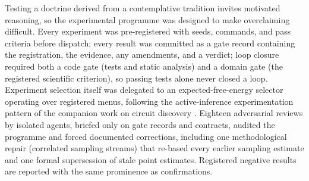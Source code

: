 Testing a doctrine derived from a contemplative tradition invites motivated reasoning, so the experimental programme was designed to make overclaiming difficult. Every experiment was pre-registered with seeds, commands, and pass criteria before dispatch; every result was committed as a gate record containing the registration, the evidence, any amendments, and a verdict; loop closure required both a code gate (tests and static analysis) and a domain gate (the registered scientific criterion), so passing tests alone never closed a loop. Experiment selection itself was delegated to an expected-free-energy selector \cite{Friston2015,DaCosta2020,Parr2022} operating over registered menus, following the active-inference experimentation pattern of the companion work on circuit discovery \cite{Sathish2026ACD}. Eighteen adversarial reviews by isolated agents, briefed only on gate records and contracts, audited the programme and forced documented corrections, including one methodological repair (correlated sampling streams) that re-based every earlier sampling estimate and one formal supersession of stale point estimates. Registered negative results are reported with the same prominence as confirmations.

